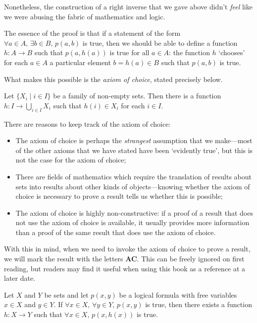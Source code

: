 Nonetheless, the construction of a right inverse that we gave above didn't \textit{feel} like we were abusing the fabric of mathematics and logic.

The essence of the proof is that if a statement of the form $\forall a \in A,\, \exists b \in B,\, p(a,b)$ is true, then we should be able to define a function $h : A \to B$ such that $p(a,h(a))$ is true for all $a \in A$: the function $h$ `chooses' for each $a \in A$ a particular element $b = h(a) \in B$ such that $p(a,b)$ is true.

What makes this possible is the \textit{axiom of choice}, stated precisely below.

\begin{axiom}
\label{axChoice}
Let $\{ X_i \mid i \in I \}$ be a family of non-empty sets. Then there is a function $h : I \to \bigcup\limits_{i \in I} X_i$ such that $h(i) \in X_i$ for each $i \in I$.
\end{axiom}

There are reasons to keep track of the axiom of choice:
\begin{itemize}
\item The axiom of choice is perhaps the \textit{strangest} assumption that we make---most of the other axioms that we have stated have been `evidently true', but this is not the case for the axiom of choice;
\item There are fields of mathematics which require the translation of results about sets into results about other kinds of objects---knowing whether the axiom of choice is necessary to prove a result tells us whether this is possible;
\item The axiom of choice is highly non-constructive: if a proof of a result that does not use the axiom of choice is available, it usually provides more information than a proof of the same result that does use the axiom of choice.
\end{itemize}

With this in mind, when we need to invoke the axiom of choice to prove a result, we will mark the result with the letters {\small \textbf{AC}}. This can be freely ignored on first reading, but readers may find it useful when using this book as a reference at a later date.

\begin{propositionac}
\label{propUsingAC}
Let $X$ and $Y$ be sets and let $p(x,y)$ be a logical formula with free variables $x \in X$ and $y \in Y$. If $\forall x \in X,\, \forall y \in Y,\, p(x,y)$ is true, then there exists a function $h : X \to Y$ such that $\forall x \in X,\, p(x,h(x))$ is true.
\end{propositionac}


